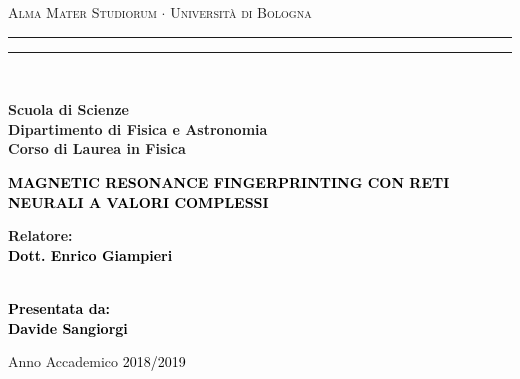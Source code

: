 \documentclass[a4paper,12pt]{report}
\begin{document}
\begin{titlepage}
%
%
%
%
\begin{center}
{{\Large{\textsc{Alma Mater Studiorum $\cdot$ Universit\`a di Bologna}}}} 
\rule[0.1cm]{15.8cm}{0.1mm}
\rule[0.5cm]{15.8cm}{0.6mm}
\\\vspace{3mm}

{\small{\bf Scuola di Scienze \\ 
Dipartimento di Fisica e Astronomia\\
Corso di Laurea in Fisica}}

\end{center}

\vspace{23mm}

\begin{center}\textcolor{black}{
%
%
{\LARGE{\bf MAGNETIC RESONANCE FINGERPRINTING CON RETI NEURALI A VALORI COMPLESSI}}\\
}\end{center}

\vspace{50mm} \par \noindent

\begin{minipage}[t]{0.47\textwidth}
%
%
{\large{\bf Relatore: \vspace{2mm}\\\textcolor{black}{
Dott. Enrico Giampieri}\\\\}}
%
%
\end{minipage}
%
\hfill
%
\begin{minipage}[t]{0.47\textwidth}\raggedleft \textcolor{black}{
{\large{\bf Presentata da:
\vspace{2mm}\\
%
%
Davide Sangiorgi}}}
\end{minipage}

\vspace{40mm}

\begin{center}
%
%
Anno Accademico \textcolor{black}{ 2018/2019}
\end{center}

\end{titlepage}
\end{document}
